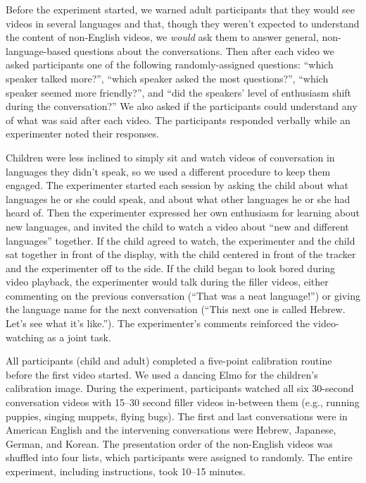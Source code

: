 \documentclass[authoryear, 12pt]{elsarticle}
\begin{document}
Before the experiment started, we warned adult participants that they would see videos in several languages and that, though they weren't expected to understand the content of non-English videos, we \textit{would} ask them to answer general, non-language-based questions about the conversations. Then after each video we asked participants one of the following randomly-assigned questions: ``which speaker talked more?'', ``which speaker asked the most questions?'', ``which speaker seemed more friendly?'', and ``did the speakers' level of enthusiasm shift during the conversation?'' We also asked if the participants could understand any of what was said after each video. The participants responded verbally while an experimenter noted their responses.

Children were less inclined to simply sit and watch videos of conversation in languages they didn't speak, so we used a different procedure to keep them engaged. The experimenter started each session by asking the child about what languages he or she could speak, and about what other languages he or she had heard of. Then the experimenter expressed her own enthusiasm for learning about new languages, and invited the child to watch a video about ``new and different languages'' together. If the child agreed to watch, the experimenter and the child sat together in front of the display, with the child centered in front of the tracker and the experimenter off to the side. If the child began to look bored during video playback, the experimenter would talk during the filler videos, either commenting on the previous conversation (``That was a neat language!'') or giving the language name for the next conversation (``This next one is called Hebrew. Let's see what it's like.''). The experimenter's comments reinforced the video-watching as a joint task.

All participants (child and adult) completed a five-point calibration routine before the first video started. We used a dancing Elmo for the children's calibration image. During the experiment, participants watched all six 30-second conversation videos with 15--30 second filler videos in-between them (e.g., running puppies, singing muppets, flying bugs). The first and last conversations were in American English and the intervening conversations were Hebrew, Japanese, German, and Korean. The presentation order of the non-English videos was shuffled into four lists, which participants were assigned to randomly. The entire experiment, including instructions, took 10--15 minutes.
\end{document}
